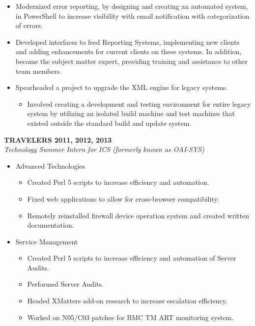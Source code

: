 \begin{cvparagraph}
\begin{itemize}
      \item Modernized error reporting, by designing and creating an automated system, 
         in PowerShell to increase visibility with email notification with categorization
         of errors.

      \item Developed interfaces to feed Reporting Systems, implementing new clients 
         and adding enhancements for current clients on these systems. In addition, 
         became the subject matter expert, providing training and assistance to 
         other team members.

      \item Spearheaded a project to upgrade the XML engine for legacy systems.
         \begin{itemize}
            \item Involved creating a development and testing environment for entire
               legacy system by utilizing an isolated build machine and test machines
               that existed outside the standard build and update system.
         \end{itemize}
   \end{itemize}

   \newpage

   {\normalsize \textbf{ TRAVELERS \hfill 2011, 2012, 2013}} \\
   {\sl Technology Summer Intern for ICS (formerly known as OAI-SYS)} \\

   \begin{itemize}
      \item Advanced Technologies
         \begin{itemize}
            \item Created Perl 5 scripts to increase efficiency and automation.
            \item Fixed web applications to allow for cross-browser compatibility.
            \item Remotely reinstalled firewall device operation system and created 
               written documentation.
         \end{itemize}

      \item Service Management
         \begin{itemize}
            \item Created Perl 5 scripts to increase efficiency and automation of 
               Server Audits.
            \item Performed Server Audits.
            \item Headed XMatters add-on research to increase escalation efficiency.
            \item Worked on N05/C03 patches for BMC TM ART monitoring system.
         \end{itemize}


\end{itemize}
\end{cvparagraph}
